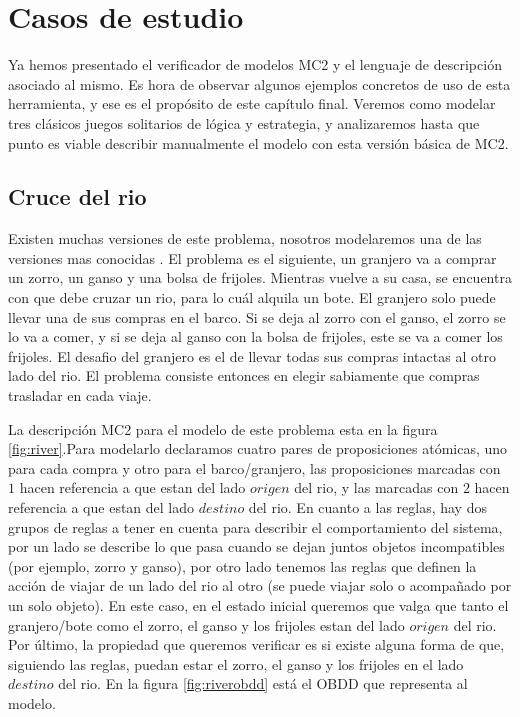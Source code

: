 \chapter{Casos de estudio}

Ya hemos presentado el verificador de modelos MC2 y el lenguaje de descripción asociado al mismo. Es hora de observar algunos ejemplos concretos de uso de esta herramienta, y ese es el propósito de este capítulo final. Veremos como modelar tres clásicos juegos solitarios de lógica y estrategia, y analizaremos hasta que punto es viable describir manualmente el modelo con esta versión básica de MC2.

\section{Cruce del rio}

Existen muchas versiones de este problema, nosotros modelaremos una de las versiones mas conocidas \cite{Hadley:12}. El problema es el siguiente, un granjero va a comprar un zorro, un ganso y una bolsa de frijoles. Mientras vuelve a su casa, se encuentra con que debe cruzar un rio, para lo cuál alquila un bote. El granjero solo puede llevar una de sus compras en el barco. Si se deja al zorro con el ganso, el zorro se lo va a comer, y si se deja al ganso con la bolsa de frijoles, este se va a comer los frijoles. El desafio del granjero es el de llevar todas sus compras intactas al otro lado del rio. El problema consiste entonces en elegir sabiamente que compras trasladar en cada viaje.

La descripción MC2 para el modelo de este problema esta en la figura \ref{fig:river}.Para modelarlo declaramos cuatro pares de proposiciones atómicas, uno para cada compra y otro para el barco/granjero, las proposiciones marcadas con $1$ hacen referencia a que estan del lado $origen$ del rio, y las marcadas con $2$ hacen referencia a que estan del lado $destino$ del rio. En cuanto a las reglas, hay dos grupos de reglas a tener en cuenta para describir el comportamiento del sistema, por un lado se describe lo que pasa cuando se dejan juntos objetos incompatibles (por ejemplo, zorro y ganso), por otro lado tenemos las reglas que definen la acción de viajar de un lado del rio al otro (se puede viajar solo o acompañado por un solo objeto). En este caso, en el estado inicial queremos que valga que tanto el granjero/bote como el zorro, el ganso y los frijoles estan del lado $origen$ del rio. Por último, la propiedad que queremos verificar es si existe alguna forma de que, siguiendo las reglas, puedan estar el zorro, el ganso y los frijoles en el lado $destino$ del rio. En la figura \ref{fig:riverobdd} está el OBDD que representa al modelo.

